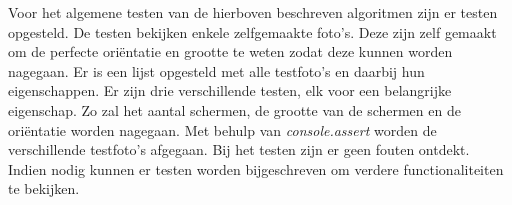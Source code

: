 Voor het algemene testen van de hierboven beschreven algoritmen zijn er testen opgesteld. De testen bekijken enkele zelfgemaakte foto's. Deze zijn zelf gemaakt om de perfecte oriëntatie en grootte te weten zodat deze kunnen worden nagegaan.
Er is een lijst opgesteld met alle testfoto's en daarbij hun eigenschappen. Er zijn drie verschillende testen, elk voor een belangrijke eigenschap. Zo zal het aantal schermen, de grootte van de schermen en de oriëntatie worden nagegaan. Met behulp van {\it console.assert} worden de verschillende testfoto's afgegaan.
Bij het testen zijn er geen fouten ontdekt. Indien nodig kunnen er testen worden bijgeschreven om verdere functionaliteiten te bekijken.